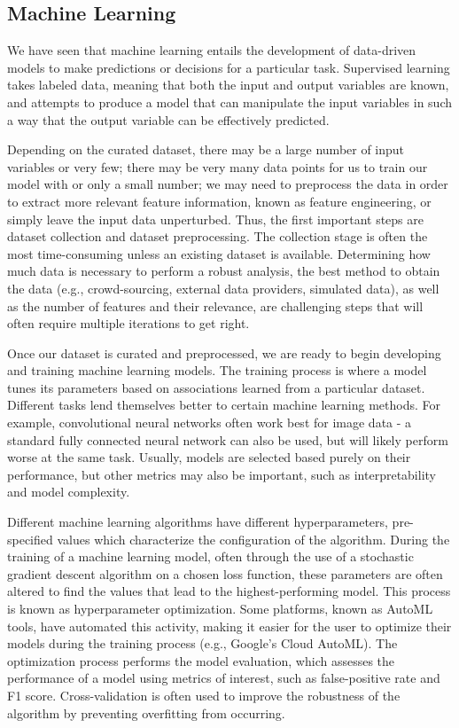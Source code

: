 \subsection{Machine Learning}

We have seen that machine learning entails the development of data-driven models to make predictions or decisions for a particular task. Supervised learning takes labeled data, meaning that both the input and output variables are known, and attempts to produce a model that can manipulate the input variables in such a way that the output variable can be effectively predicted.

Depending on the curated dataset, there may be a large number of input variables or very few; there may be very many data points for us to train our model with or only a small number; we may need to preprocess the data in order to extract more relevant feature information, known as feature engineering, or simply leave the input data unperturbed. Thus, the first important steps are dataset collection and dataset preprocessing. The collection stage is often the most time-consuming unless an existing dataset is available. Determining how much data is necessary to perform a robust analysis, the best method to obtain the data (e.g., crowd-sourcing, external data providers, simulated data), as well as the number of features and their relevance, are challenging steps that will often require multiple iterations to get right.

Once our dataset is curated and preprocessed, we are ready to begin developing and training machine learning models. The training process is where a model tunes its parameters based on associations learned from a particular dataset. Different tasks lend themselves better to certain machine learning methods. For example, convolutional neural networks often work best for image data - a standard fully connected neural network can also be used, but will likely perform worse at the same task. Usually, models are selected based purely on their performance, but other metrics may also be important, such as interpretability and model complexity.

Different machine learning algorithms have different hyperparameters, pre-specified values which characterize the configuration of the algorithm. During the training of a machine learning model, often through the use of a stochastic gradient descent algorithm on a chosen loss function, these parameters are often altered to find the values that lead to the highest-performing model. This process is known as hyperparameter optimization. Some platforms, known as AutoML tools, have automated this activity, making it easier for the user to optimize their models during the training process (e.g., Google’s Cloud AutoML). The optimization process performs the model evaluation, which assesses the performance of a model using metrics of interest, such as false-positive rate and F1 score. Cross-validation is often used to improve the robustness of the algorithm by preventing overfitting from occurring.

